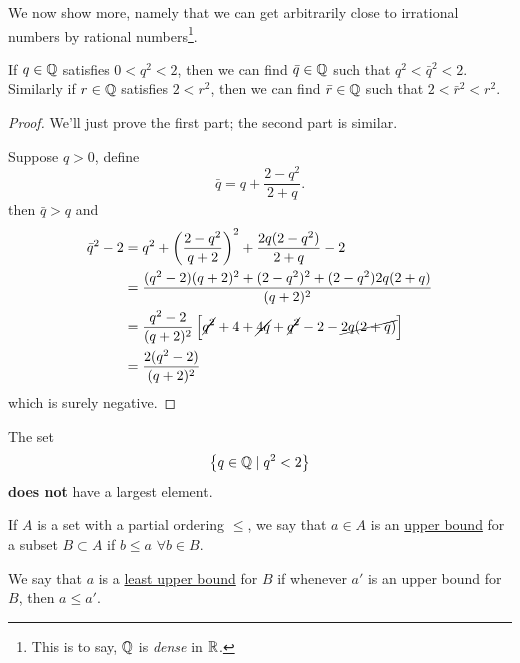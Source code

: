 We now show more, namely that we can get arbitrarily close to irrational numbers by rational numbers\footnote{This is to say, $\mathbb Q$ is \emph{dense} in $\mathbb R$.}.
\begin{theorem}
    If $q\in\mathbb Q$ satisfies $0 < q^2 < 2$, then we can find $\bar{q}\in\mathbb Q$ such that $q^2 < \bar{q}^2 < 2$. Similarly if $r\in\mathbb Q$ satisfies $2 < r^2$, then we can find $\bar{r}\in\mathbb Q$ such that $2 < \bar{r}^2 < r^2$.
\end{theorem}
\begin{proof}
    We'll just prove the first part; the second part is similar.

    Suppose $q > 0$, define
    \[\bar{q} = q + \frac{2 - q^2}{2 + q}.\]
    then $\bar{q} > q$ and
    \begin{align*}
        \bar{q}^2 - 2 & = q^2 + \left( \frac{2-q^2}{q+2} \right)^2 + \frac{2q(2-q^2)}{2+q} - 2                                       \\
                      & = \frac{(q^2 - 2)(q+2)^2 + (2-q^2)^2 + (2-q^2)2q(2+q)}{(q+2)^2}                                              \\
                      & = \frac{q^2 - 2}{(q+2)^2}\left[ \cancel{q^2} + 4 + \cancel{4q} + \cancel{q^2} - 2 - \cancel{2q(2+q)} \right] \\
                      & = \frac{2(q^2 - 2)}{(q+2)^2}
    \end{align*}
    which is surely negative.
\end{proof}
\begin{corollary}
    The set
    \[\left\{ q\in\mathbb Q\mid q^2 < 2 \right\}\]
    \textbf{does not} have a largest element.
\end{corollary}

\begin{definition}
    If $A$ is a set with a partial ordering $\leq$, we say that $a\in A$ is an \ul{upper bound} for a subset $B\subset A$ if $b\leq a$ $\forall b\in B$.

    We say that $a$ is a \ul{least upper bound} for $B$ if whenever $a'$ is an upper bound for $B$, then $a\leq a'$.
\end{definition}

